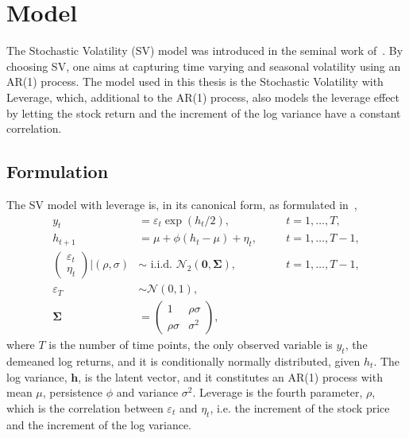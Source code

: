 \newcommand*{\yts}{y_t^\ast}
\newcommand*{\ets}{\varepsilon_t^\ast}

\section{Model}

The Stochastic Volatility (SV) model was introduced in the seminal work of~\citet{taylor1982financial}.
By choosing SV, one aims at capturing time varying and seasonal volatility using an AR(1) process.
The model used in this thesis is the Stochastic Volatility with Leverage, which, additional to the AR(1) process, also models the leverage effect by letting the stock return and the increment of the log variance have a constant correlation.

\subsection{Formulation}

The SV model with leverage is, in its canonical form, as formulated in~\citet{Omori2007},
\begin{equation}
\begin{alignedat}{2}\label{form:orig_model}
y_t & = \varepsilon_t\exp\left(h_t/2\right), && \quad t=1,\dots,T, \\
h_{t+1} & = \mu+\phi(h_t-\mu)+\eta_t, && \quad t=1,\dots,T-1, \\
\begin{pmatrix}
\varepsilon_t \\
\eta_t
\end{pmatrix}
\bigg\vert\left(\rho,\sigma\right) & \sim\text{ i.i.d. }\mathcal{N}_2\left(\bm{0},\bm{\Sigma}\right), && \quad t=1,\dots,T-1, \\
\varepsilon_T &\sim\mathcal{N}(0,1), \\
\bm{\Sigma} & =
\begin{pmatrix}
1 & \rho\sigma \\
\rho\sigma & \sigma^2
\end{pmatrix},
\end{alignedat}
\end{equation}
where $T$ is the number of time points, the only observed variable is $y_t$, the demeaned log returns, and it is conditionally normally distributed, given $h_t$.
The log variance, $\bm{h}$, is the latent vector, and it constitutes an AR(1) process with mean $\mu$, persistence $\phi$ and variance $\sigma^2$.
Leverage is the fourth parameter, $\rho$, which is the correlation between $\varepsilon_t$ and $\eta_t$, i.e. the increment of the stock price and the increment of the log variance.

